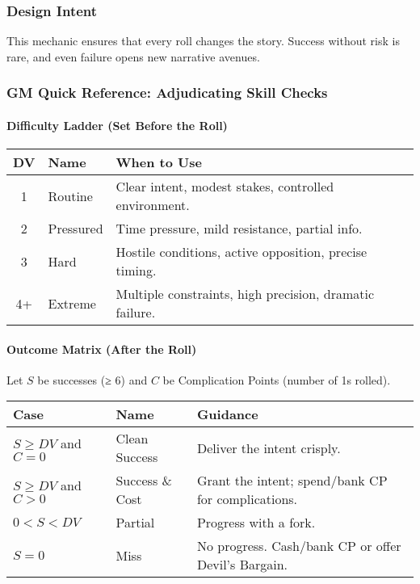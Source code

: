 \documentclass[11pt]{article}
\begin{document}
\subsubsection{Design Intent}
This mechanic ensures that every roll changes the story. Success without risk is rare, and even failure opens new narrative avenues.

\subsubsection{GM Quick Reference: Adjudicating Skill Checks}

\paragraph{Difficulty Ladder (Set Before the Roll)}
\begin{center}
\begin{tabular}{cll}
\toprule
\textbf{DV} & \textbf{Name} & \textbf{When to Use} \\
\midrule
1 & Routine & Clear intent, modest stakes, controlled environment. \\
2 & Pressured & Time pressure, mild resistance, partial info. \\
3 & Hard & Hostile conditions, active opposition, precise timing. \\
4+ & Extreme & Multiple constraints, high precision, dramatic failure. \\
\bottomrule
\end{tabular}
\end{center}

\paragraph{Outcome Matrix (After the Roll)}
Let $S$ be successes (≥ 6) and $C$ be Complication Points (number of 1s rolled).
\begin{center}
\begin{tabular}{lll}
\toprule
\textbf{Case} & \textbf{Name} & \textbf{Guidance} \\
\midrule
$S \geq DV$ and $C = 0$ & Clean Success & Deliver the intent crisply. \\
$S \geq DV$ and $C > 0$ & Success \& Cost & Grant the intent; spend/bank CP for complications. \\
$0 < S < DV$ & Partial & Progress with a fork. \\
$S = 0$ & Miss & No progress. Cash/bank CP or offer Devil's Bargain. \\
\bottomrule
\end{tabular}
\end{center}
\end{document}
